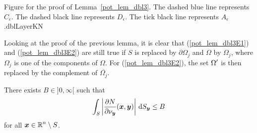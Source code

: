 {Figure for the proof of Lemma~\ref{pot_lem_dbl3}.  The dashed blue
line represents $C_\epsilon$.  The dashed black line represents
$D_\epsilon$.  The tick black line represents $A_\epsilon$.}{dblLayerKN}

\begin{rmk}
Looking at the proof of the previous lemma, it is clear that
(\ref{pot_lem_dbl3E1}) and (\ref{pot_lem_dbl3E2}) are still true if
$S$ is replaced by $\partial \Omega_j$ and $\Omega$ by $\Omega_j$,
where $\Omega_j$ is one of the components of $\Omega$.  For
(\ref{pot_lem_dbl3E2}), the set $\displaystyle \Omega^{\prime}$ is
then replaced by the complement of
$\overline{\Omega_j}$.     \label{pot_lem_dbl3_rmk} 
\end{rmk}

\begin{lemma} \label{pot_lem_dbl4}
There exists $B \in ]0,\infty[$ such that 
\[
\int_S \left| \frac{\partial{N}}{\partial \nu_{{\bm{y}}}}({\bm{x}},{\bm{y}})
\right| \,\mathrm{d}{S}_{{\bm{y}}} \leq B
\]
for all $\displaystyle {\bm{x}} \in \mathbb{R}^n\setminus S$.
\end{lemma}

